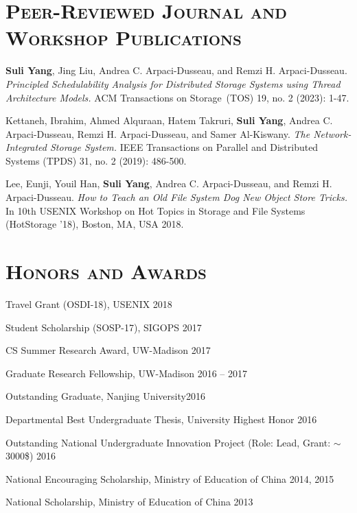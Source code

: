 \documentclass[10pt, letterpaper]{article}
\renewenvironment{itemize}{
  \begin{list}{}{
    \setlength{\leftmargin}{1.2em}
    \setlength{\itemsep}{0.12em}
    \setlength{\parskip}{0pt}
    \setlength{\parsep}{0.12em}
  }
}{
  \end{list}
}
\begin{document}
\section*{\textsc{Peer-Reviewed Journal and Workshop Publications}}

\begin{enumerate}[fullwidth,itemindent=1em,label={[\arabic*]}]
      \item {\bf Suli Yang}, Jing Liu, Andrea C. Arpaci-Dusseau, and Remzi H. Arpaci-Dusseau. \textit{Principled Schedulability Analysis for Distributed Storage Systems using Thread Architecture Models.} 
      ACM Transactions on Storage~(TOS) 19, no. 2 (2023): 1-47.
      
      \item Kettaneh, Ibrahim, Ahmed Alquraan, Hatem Takruri, {\bf Suli Yang}, Andrea C. Arpaci-Dusseau, Remzi H. Arpaci-Dusseau, and Samer Al-Kiswany. \textit{The Network-Integrated Storage System.} 
      IEEE Transactions on Parallel and Distributed Systems (TPDS) 31, no. 2 (2019): 486-500.

       \item Lee, Eunji, Youil Han, {\bf Suli Yang}, Andrea C. Arpaci-Dusseau, and Remzi H. Arpaci-Dusseau. \textit{How to Teach an Old File System Dog New Object Store Tricks.} 
        In 10th {USENIX} Workshop on Hot Topics in Storage and File Systems (HotStorage '18), Boston, MA, USA 2018.
	
\end{enumerate}

\section*{\textsc{Honors and Awards}}
\begin{itemize}
  \item Travel Grant (OSDI-18), USENIX \hfill 2018
  \item Student Scholarship (SOSP-17), SIGOPS \hfill 2017
  \item CS Summer Research Award, UW-Madison \hfill 2017
  \item Graduate Research Fellowship, UW-Madison \hfill 2016 -- 2017
  \item Outstanding Graduate, Nanjing University\hfill 2016
  \item Departmental Best Undergraduate Thesis, University Highest Honor \hfill 2016
  \item Outstanding National Undergraduate Innovation Project (Role: Lead, Grant: $\sim$3000\$)  \hfill 2016
  \item National Encouraging Scholarship, Ministry of Education of China \hfill 2014, 2015
  \item National Scholarship, Ministry of Education of China \hfill 2013
\end{itemize}
\fi
\end{document}
